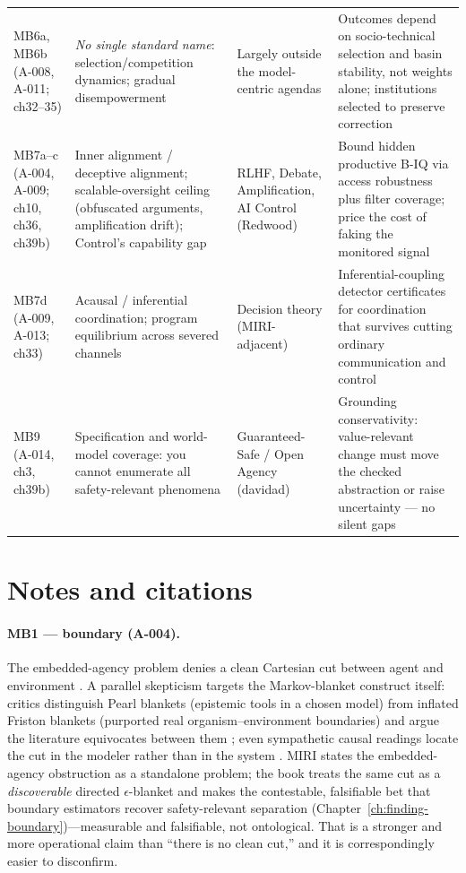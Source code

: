 \begin{longtable}{@{}p{}p{}p{}p{}@{}}
MB6a, MB6b \newline (A-008, A-011; ch32--35) & \emph{No single standard name}: selection/competition dynamics; gradual disempowerment & Largely outside the model-centric agendas & Outcomes depend on socio-technical selection and basin stability, not weights alone; institutions selected to preserve correction \\
MB7a--c \newline (A-004, A-009; ch10, ch36, ch39b) & Inner alignment / deceptive alignment; scalable-oversight ceiling (obfuscated arguments, amplification drift); Control's capability gap & RLHF, Debate, Amplification, AI Control (Redwood) & Bound hidden productive B-IQ via access robustness plus filter coverage; price the cost of faking the monitored signal \\
MB7d \newline (A-009, A-013; ch33) & Acausal / inferential coordination; program equilibrium across severed channels & Decision theory (MIRI-adjacent) & Inferential-coupling detector certificates for coordination that survives cutting ordinary communication and control \\
MB9 \newline (A-014, ch3, ch39b) & Specification and world-model coverage: you cannot enumerate all safety-relevant phenomena & Guaranteed-Safe / Open Agency (davidad) & Grounding conservativity: value-relevant change must move the checked abstraction or raise uncertainty --- no silent gaps \\
\end{longtable}
\renewcommand{\arraystretch}{1.0}

\section{Notes and citations}
\label{sec:bridge-crosswalk-notes}

\paragraph{MB1 --- boundary (A-004).}
The embedded-agency problem denies a clean Cartesian cut between agent and environment \autocite{demski2019embedded}.
A parallel skepticism targets the Markov-blanket construct itself: critics distinguish Pearl blankets (epistemic tools in a chosen model) from inflated Friston blankets (purported real organism--environment boundaries) and argue the literature equivocates between them \autocite{bruineberg2021emperor,btesh2022redressing,biehl2020fepcritique}; even sympathetic causal readings locate the cut in the modeler rather than in the system \autocite{btesh2022redressing}.
MIRI states the embedded-agency obstruction as a standalone problem; the book treats the same cut as a \emph{discoverable} directed \(\epsilon\)-blanket and makes the contestable, falsifiable bet that boundary estimators recover safety-relevant separation (Chapter~\ref{ch:finding-boundary})---measurable and falsifiable, not ontological.
That is a stronger and more operational claim than ``there is no clean cut,'' and it is correspondingly easier to disconfirm.

